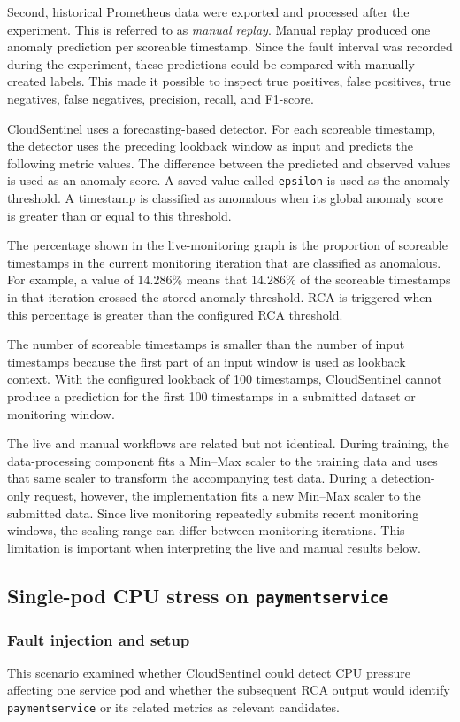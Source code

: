 Second, historical Prometheus data were exported and processed after the experiment. This is referred to as \textit{manual replay}. Manual replay produced one anomaly prediction per scoreable timestamp. Since the fault interval was recorded during the experiment, these predictions could be compared with manually created labels. This made it possible to inspect true positives, false positives, true negatives, false negatives, precision, recall, and F1-score.

CloudSentinel uses a forecasting-based detector. For each scoreable timestamp, the detector uses the preceding lookback window as input and predicts the following metric values. The difference between the predicted and observed values is used as an anomaly score. A saved value called \texttt{epsilon} is used as the anomaly threshold. A timestamp is classified as anomalous when its global anomaly score is greater than or equal to this threshold.

The percentage shown in the live-monitoring graph is the proportion of scoreable timestamps in the current monitoring iteration that are classified as anomalous. For example, a value of 14.286\% means that 14.286\% of the scoreable timestamps in that iteration crossed the stored anomaly threshold. RCA is triggered when this percentage is greater than the configured RCA threshold.

The number of scoreable timestamps is smaller than the number of input timestamps because the first part of an input window is used as lookback context. With the configured lookback of 100 timestamps, CloudSentinel cannot produce a prediction for the first 100 timestamps in a submitted dataset or monitoring window.

The live and manual workflows are related but not identical. During training, the data-processing component fits a Min--Max scaler to the training data and uses that same scaler to transform the accompanying test data. During a detection-only request, however, the implementation fits a new Min--Max scaler to the submitted data. Since live monitoring repeatedly submits recent monitoring windows, the scaling range can differ between monitoring iterations. This limitation is important when interpreting the live and manual results below.

\subsection{Single-pod CPU stress on \texttt{paymentservice}}
\subsubsection{Fault injection and setup}
This scenario examined whether CloudSentinel could detect CPU pressure affecting one service pod and whether the subsequent RCA output would identify \texttt{paymentservice} or its related metrics as relevant candidates.

